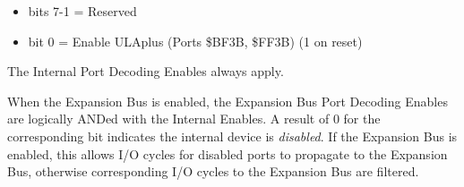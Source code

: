 \begin{itemize}
\item bits 7-1 = Reserved
\item bit 0 = Enable ULAplus (Ports \$BF3B, \$FF3B) (1 on reset)
\end{itemize}

The Internal Port Decoding Enables always apply.

When the Expansion Bus is enabled, the Expansion Bus Port Decoding
Enables are logically ANDed with the Internal Enables. A result of 0
for the corresponding bit indicates the internal device is
\emph{disabled}. If the Expansion Bus is enabled, this allows
I/O cycles for disabled ports to propagate to the Expansion Bus,
otherwise corresponding I/O cycles to the Expansion Bus are filtered.

